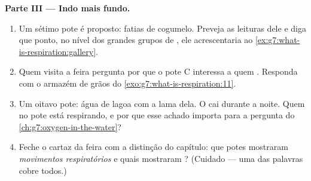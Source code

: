 \begin{problem}
\medskip\noindent\textbf{Parte III --- Indo mais fundo.}
\begin{enumerate}[resume]
  \item Um sétimo pote é proposto: fatias de cogumelo. Preveja as
        leituras dele e diga que ponto, no nível dos grandes grupos de
        , ele acrescentaria ao
        \cref{ex:g7:what-is-respiration:gallery}.
  \item Quem visita a feira pergunta por que o pote C interessa a quem
        . Responda com o armazém de grãos do
        \cref{exo:g7:what-is-respiration:11}.
  \item Um oitavo pote: água de lagoa com a lama dela. O  cai
        durante a noite. Quem no pote está respirando, e por que esse
        achado importa para a pergunta do
        \cref{ch:g7:oxygen-in-the-water}?
  \item Feche o cartaz da feira com a distinção do capítulo: que potes
        mostraram \emph{movimentos respiratórios} e quais mostraram
        \emph{}? (Cuidado --- uma das palavras cobre todos.)
\end{enumerate}
\end{problem}
